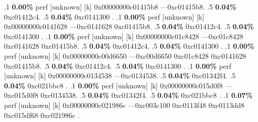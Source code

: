 \begin{profile}
{.1 \textbf{ 0.00\%} perf             [unknown]              [k] 0x00000000c01415b8\newline {} ---0xc01415b8. 
.5 \textbf{0.04\%} 0xc01412c4. 
.5 \textbf{0.04\%} 0xc0141300\newline {} . 
.1 \textbf{ 0.00\%} perf             [unknown]              [k] 0x00000000c0141628\newline {} ---0xc0141628\newline {} 0xc01415b8. 
.5 \textbf{0.04\%} 0xc01412c4. 
.5 \textbf{0.04\%} 0xc0141300\newline {} . 
.1 \textbf{ 0.00\%} perf             [unknown]              [k] 0x00000000c01c8428\newline {} ---0xc01c8428\newline {} 0xc0141628\newline {} 0xc01415b8. 
.5 \textbf{0.04\%} 0xc01412c4. 
.5 \textbf{0.04\%} 0xc0141300\newline {} . 
.1 \textbf{ 0.00\%} perf             [unknown]              [k] 0x00000000c00d6650\newline {} ---0xc00d6650\newline {} 0xc01c8428\newline {} 0xc0141628\newline {} 0xc01415b8. 
.5 \textbf{0.04\%} 0xc01412c4. 
.5 \textbf{0.04\%} 0xc0141300\newline {} . 
.1 \textbf{ 0.00\%} perf             [unknown]              [k] 0x00000000c0134538\newline {} ---0xc0134538. 
.5 \textbf{0.04\%} 0xc01342f4. 
.5 \textbf{0.04\%} 0xc021bbc8\newline {} . 
.1 \textbf{ 0.00\%} perf             [unknown]              [k] 0x00000000c015d0f8\newline {} ---0xc015d0f8\newline {} 0xc0134538. 
.5 \textbf{0.04\%} 0xc01342f4. 
.5 \textbf{0.04\%} 0xc021bbc8\newline {} . 
.1 \textbf{ 0.07\%} perf             [unknown]              [k] 0x00000000c021986c\newline {} ---0xc003c100\newline {} 0xc0113f48\newline {} 0xc0113dd8\newline {} 0xc015df68\newline {} 0xc021986c\newline {} . 
}
\end{profile}
